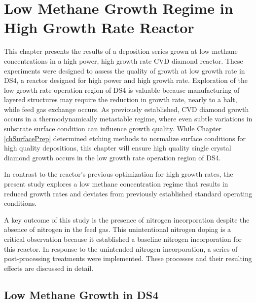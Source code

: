 \chapter{Low Methane Growth Regime in High Growth Rate Reactor}
\label{chLowCH4}
\indent

This chapter presents the results of a deposition series grown at low methane concentrations in a high power, high growth rate CVD diamond reactor. These experiments were designed to assess the quality of growth at low growth rate in DS4, a reactor designed for high power and high growth rate. Exploration of the low growth rate operation region of DS4 is valuable because manufacturing of layered structures may require the reduction in growth rate, nearly to a halt, while feed gas exchange occurs. As previously established, CVD diamond growth occurs in a thermodynamically metastable regime, where even subtle variations in substrate surface condition can influence growth quality. While Chapter \ref{chSurfacePrep} determined etching methods to normalize surface conditions for high quality depositions, this chapter will ensure high quality single crystal diamond growth occurs in the low growth rate operation region of DS4.

In contrast to the reactor's previous optimization for high growth rates, the present study explores a low methane concentration regime that results in reduced growth rates and deviates from previously established standard operating conditions. 

A key outcome of this study is the presence of nitrogen incorporation despite the absence of nitrogen in the feed gas. This unintentional nitrogen doping is a critical observation because it established a baseline nitrogen incorporation for this reactor. In response to the unintended nitrogen incorporation, a series of post-processing treatments were implemented. These processes and their resulting effects are discussed in detail.

\section{Low Methane Growth in DS4}
\indent

